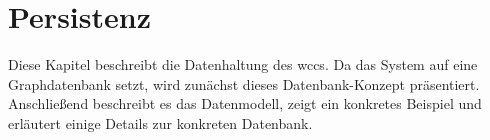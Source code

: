 \section{Persistenz}
    \label{section:solutionDetailsPersistence}
    Diese Kapitel beschreibt die Datenhaltung des \gls{wccs}.
    Da das System auf eine Graphdatenbank setzt,
    wird zunächst dieses Datenbank-Konzept präsentiert.
    Anschließend beschreibt es das Datenmodell, zeigt ein konkretes Beispiel
    und erläutert einige Details zur konkreten Datenbank.

    
    
    
    
